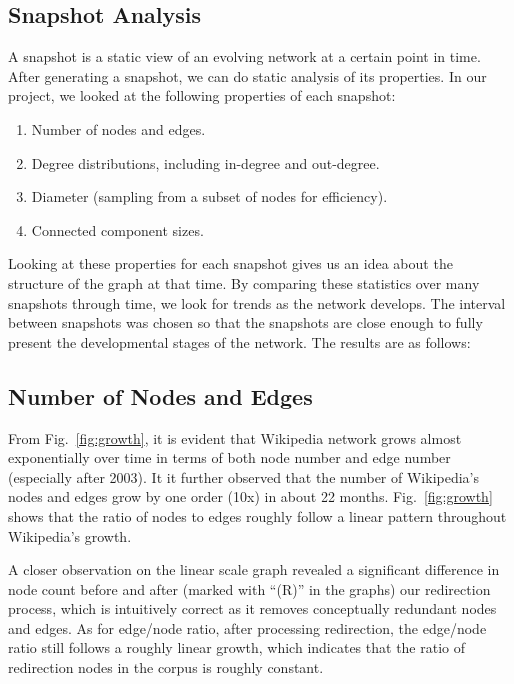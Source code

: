 \documentclass[10pt]{article}
\begin{document}
\begin{multicols}{2}
\section{Snapshot Analysis}
A snapshot is a static view of an evolving network at a certain point in time. After generating a snapshot, we can do static analysis of its properties. In our project, we looked at the following properties of each snapshot:
\begin{enumerate}
\item Number of nodes and edges.
\item Degree distributions, including in-degree and out-degree.
\item Diameter (sampling from a subset of nodes for efficiency).
\item Connected component sizes.
\end{enumerate}

Looking at these properties for each snapshot gives us an idea about the structure of the graph at that time. By comparing these statistics over many snapshots through time, we look for trends as the network develops. The interval between snapshots was chosen so that the snapshots are close enough to fully present the developmental stages of the network. The results are as follows:

\subsection{Number of Nodes and Edges}
From Fig.~\ref{fig:growth}, it is evident that Wikipedia network grows almost exponentially over time in terms of both node number and edge number (especially after 2003). It it further observed that the number of Wikipedia's nodes and edges grow by one order (10x) in about 22 months. Fig.~\ref{fig:growth} shows that the ratio of nodes to edges roughly follow a linear pattern throughout Wikipedia's growth.

A closer observation on the linear scale graph revealed a significant difference in node count before and after (marked with ``(R)'' in the graphs) our redirection process, which is intuitively correct as it removes conceptually redundant nodes and edges. As for edge/node ratio, after processing redirection, the edge/node ratio still follows a roughly linear growth, which indicates that the ratio of redirection nodes in the corpus is roughly constant.


\end{multicols}
\end{document}
